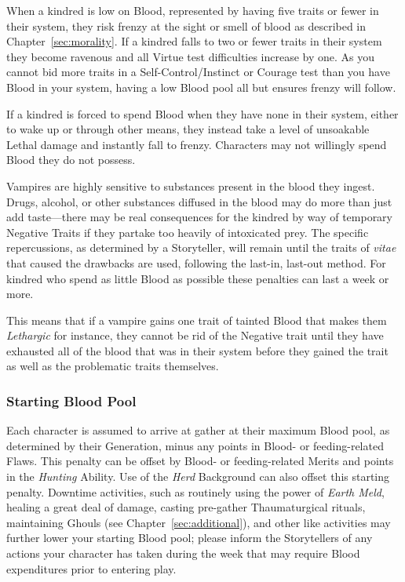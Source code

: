 When a kindred is low on Blood, represented by having five traits or fewer in their system, 
they risk frenzy at the sight or smell of blood as described in Chapter~\ref{sec:morality}.  
If a kindred falls to two or fewer traits in their system they become ravenous and all 
Virtue test difficulties increase by one.  As you cannot bid more traits in a 
Self-Control/Instinct or Courage test than you have Blood in your system, having a low 
Blood pool all but ensures frenzy will follow.

If a kindred is forced to spend Blood when they have none in their system, either 
to wake up or through other means, they instead take a level of unsoakable Lethal 
damage and instantly fall to frenzy.  Characters may not willingly spend Blood they 
do not possess.

Vampires are highly sensitive to substances present in the blood they ingest.  Drugs, 
alcohol, or other substances diffused in the blood may do more than just add taste---there 
may be real consequences for the kindred by way of temporary Negative Traits if they partake 
too heavily of intoxicated prey.  The specific repercussions, as determined by a Storyteller, 
will remain until the traits of \emph{vitae} that caused the drawbacks are used, following 
the last-in, last-out method.  For kindred who spend as little Blood as possible these 
penalties can last a week or more.  

This means that if a vampire gains one trait of tainted Blood that makes them \emph{Lethargic} 
for instance, they cannot be rid of the Negative trait until they have exhausted all of the 
blood that was in their system before they gained the trait as well as the problematic traits 
themselves.

\subsubsection{Starting Blood Pool}
Each character is assumed to arrive at gather at their maximum Blood pool, as determined by their 
Generation, minus any points in Blood- or feeding-related Flaws.  This penalty can be offset by 
Blood- or feeding-related Merits and points in the \emph{Hunting} Ability. Use of the \emph{Herd} 
Background can also offset this starting penalty.  Downtime activities, such as routinely using 
the power of \emph{Earth Meld}, healing a great deal of damage, casting pre-gather Thaumaturgical 
rituals, maintaining Ghouls (see Chapter~\ref{sec:additional}), and other like activities may 
further lower your starting Blood pool; please inform the Storytellers of any actions your 
character has taken during the week that may require Blood expenditures prior to entering play.

